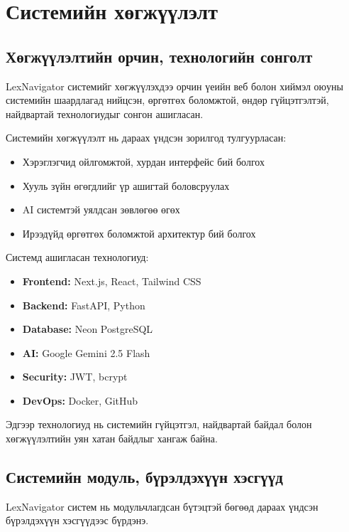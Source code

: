\chapter{Системийн хөгжүүлэлт}

\section{Хөгжүүлэлтийн орчин, технологийн сонголт}

LexNavigator системийг хөгжүүлэхдээ орчин үеийн веб болон хиймэл оюуны системийн шаардлагад нийцсэн, өргөтгөх боломжтой, өндөр гүйцэтгэлтэй, найдвартай технологиудыг сонгон ашигласан.

Системийн хөгжүүлэлт нь дараах үндсэн зорилгод тулгуурласан:

\begin{itemize}
    \item Хэрэглэгчид ойлгомжтой, хурдан интерфейс бий болгох
    \item Хууль зүйн өгөгдлийг үр ашигтай боловсруулах
    \item AI системтэй уялдсан зөвлөгөө өгөх
    \item Ирээдүйд өргөтгөх боломжтой архитектур бий болгох
\end{itemize}

\noindent Системд ашигласан технологиуд:

\begin{itemize}
    \item \textbf{Frontend:} Next.js, React, Tailwind CSS
    \item \textbf{Backend:} FastAPI, Python
    \item \textbf{Database:} Neon PostgreSQL
    \item \textbf{AI:} Google Gemini 2.5 Flash
    \item \textbf{Security:} JWT, bcrypt
    \item \textbf{DevOps:} Docker, GitHub
\end{itemize}

Эдгээр технологиуд нь системийн гүйцэтгэл, найдвартай байдал болон хөгжүүлэлтийн уян хатан байдлыг хангаж байна.


\section{Системийн модуль, бүрэлдэхүүн хэсгүүд}

LexNavigator систем нь модульчлагдсан бүтэцтэй бөгөөд дараах үндсэн бүрэлдэхүүн хэсгүүдээс бүрдэнэ.

